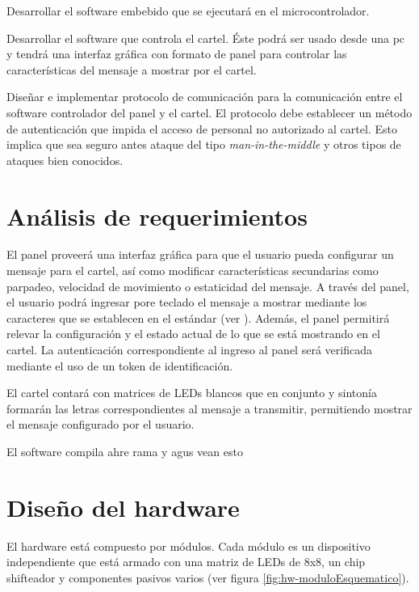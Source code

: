 Desarrollar el software embebido que se ejecutará en el microcontrolador.

Desarrollar el software que controla el cartel. Éste podrá ser usado desde una pc y tendrá una interfaz gráfica con formato de panel para controlar las características del mensaje a mostrar por el cartel.

Diseñar e implementar protocolo de comunicación para la comunicación entre el software controlador del panel y el cartel. El protocolo debe establecer un método de autenticación que impida el acceso de personal no autorizado al cartel. Esto implica que sea seguro antes ataque del tipo \emph{man-in-the-middle} y otros tipos de ataques bien conocidos.

\section{Análisis de requerimientos}



El panel proveerá una interfaz gráfica para que el usuario pueda configurar un mensaje para el cartel, así como modificar características secundarias como parpadeo, velocidad de movimiento o estaticidad del mensaje. A través del panel, el usuario podrá ingresar pore teclado el mensaje a mostrar mediante los caracteres que se establecen en el estándar (ver \cite{CodifChar}). Además, el panel permitirá relevar la configuración y el estado actual de lo que se está mostrando en el cartel. La autenticación correspondiente al ingreso al panel será verificada mediante el uso de un token de identificación.

El cartel contará con matrices de LEDs blancos que en conjunto y sintonía formarán las letras correspondientes al mensaje a transmitir, permitiendo mostrar el mensaje configurado por el usuario. 

El software compila ahre rama y agus vean esto


\section{Diseño del hardware}
El hardware está compuesto por módulos. Cada módulo es un dispositivo independiente que está armado con una matriz de LEDs de 8x8, un chip shifteador \cite{MAX7219} y componentes pasivos varios (ver figura \ref{fig:hw-moduloEsquematico}). 


